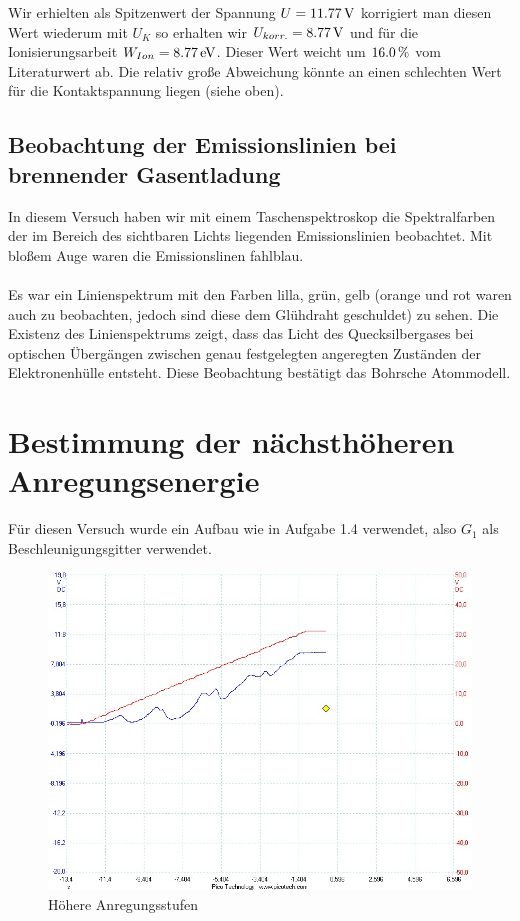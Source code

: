 \documentclass[a4paper,titlepage]{scrartcl}
\numberwithin{equation}{section}
\begin{document}
\begin{itemize}
Wir erhielten als Spitzenwert der Spannung $U = \unit[11.77]{V}$ korrigiert man diesen Wert wiederum mit $U_{K}$ so erhalten wir $U_{korr.}=\unit[8.77]{V}$ und für die Ionisierungsarbeit $W_{Ion}=\unit[8.77]{eV}$. Dieser Wert weicht um $\unit[16.0]{\%}$ vom Literaturwert ab. Die relativ große Abweichung könnte an einen schlechten Wert für die Kontaktspannung liegen (siehe oben).\\

\end{itemize}

\subsection{Beobachtung der Emissionslinien bei brennender Gasentladung}
In diesem Versuch haben wir mit einem Taschenspektroskop die Spektralfarben der im Bereich des sichtbaren Lichts liegenden Emissionslinien beobachtet. Mit bloßem Auge waren die Emissionslinen fahlblau.\\ \\
Es war ein Linienspektrum mit den Farben lilla, grün, gelb (orange und rot waren auch zu beobachten, jedoch sind diese dem Glühdraht geschuldet) zu sehen. Die Existenz des Linienspektrums zeigt, dass das Licht des Quecksilbergases bei optischen Übergängen zwischen genau festgelegten angeregten Zuständen der Elektronenhülle entsteht. Diese Beobachtung bestätigt das Bohrsche Atommodell.
\section{Bestimmung der nächsthöheren Anregungsenergie}

Für diesen Versuch wurde ein Aufbau wie in Aufgabe 1.4 verwendet, also $G_1$ als Beschleunigungsgitter verwendet.

\begin{figure}[H]
\centering
\includegraphics[scale=.4]{bilder/aufgabe2.jpg}
\caption{Höhere Anregungsstufen} 
\end{figure}
\end{document}
